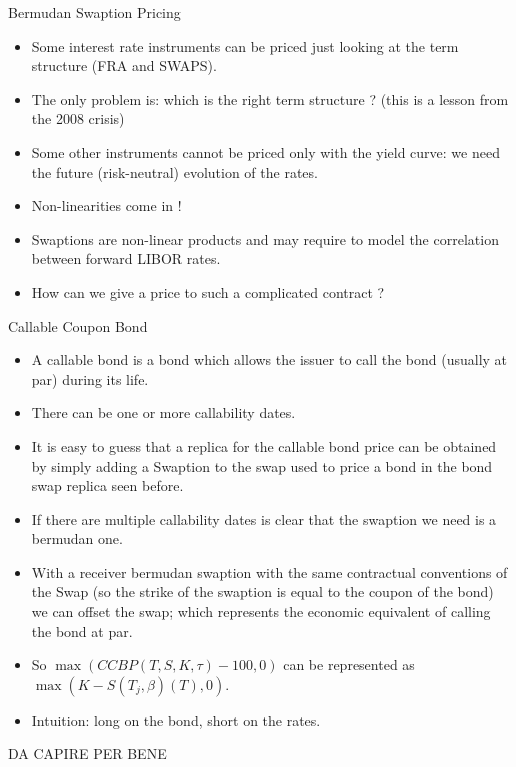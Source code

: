 \documentclass{beamer}
\begin{document}
\begin{frame}{Bermudan Swaption Pricing}
	\begin{itemize}
		\item Some interest rate instruments can be priced just looking at the term structure (FRA and SWAPS).
		\item The only problem is: which is the right term structure ? (this is a lesson from the 2008 crisis) 
		\item Some other instruments cannot be priced only with the yield curve: we need the future (risk-neutral) evolution of the rates.
		\item Non-linearities come in !
		\item Swaptions are non-linear products and may require to model the correlation between forward LIBOR rates.
		\item How can we give a price to such a complicated contract ?
	\end{itemize}
\end{frame}


\begin{frame}{Callable Coupon Bond}
	\begin{itemize}
		\item A callable bond is a bond which allows the issuer to call the bond (usually at par) during its life.
		\item There can be one or more callability dates.
		\item It is easy to guess that a replica for the callable bond price can be obtained by simply adding a Swaption to the swap used to price a bond in the bond swap replica seen before.
		\item If there are multiple callability dates is clear that the swaption we need is a bermudan one.
		\item With a receiver bermudan swaption with the same contractual conventions of the Swap (so the strike of the swaption is equal to the coupon of the bond) we can offset the swap; which represents the economic equivalent of calling the bond at par.
		\item So $\max(CCBP(T,S,K,\tau)-100, 0)$ can be represented as $\max(K-S(T_j,\beta)(T), 0)$.
		\item Intuition: long on the bond, short on the rates.
	\end{itemize}
	DA CAPIRE PER BENE
\end{frame}
\end{document}
